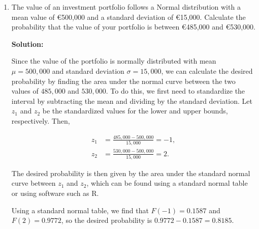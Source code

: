 \documentclass[12pt]{article}
\begin{document}
\begin{enumerate}
{\begin{enumerate}
\item Interpret the coefficients \( a \) and \( b \) from an economic perspective:

\begin{itemize}
    \item The intercept \( a = 2 \) represents the predicted inflation rate when the unemployment rate is zero. In economic terms, even with no unemployment, there is still some expected inflation (2%
    \item The slope \( b = -0.1 \) indicates that for each 1\% increase in the unemployment rate, inflation is expected to decrease by 0.1\%. This is consistent with the inverse relationship described by the Phillips curve, which suggests that higher unemployment typically leads to lower inflation.
\end{itemize}

\end{enumerate}


}

\item   The value of an investment portfolio follows a Normal distribution with a mean value of €500,000 and a standard deviation of €15,000. Calculate the probability that the value of your portfolio is between €485,000 and €530,000.

{\color{blue}
\noindent \textbf{Solution:}

Since the value of the portfolio is normally distributed with mean $\mu = 500,000$ and standard deviation $\sigma = 15,000$, we can calculate the desired probability by finding the area under the normal curve between the two values of $485,000$ and $530,000$. To do this, we first need to standardize the interval by subtracting the mean and dividing by the standard deviation. Let $z_1$ and $z_2$ be the standardized values for the lower and upper bounds, respectively. Then,

\begin{align*}
	z_1 &= \frac{485,000 - 500,000}{15,000} = -1, \\
	z_2 &= \frac{530,000 - 500,000}{15,000} = 2.
\end{align*}

The desired probability is then given by the area under the standard normal curve between $z_1$ and $z_2$, which can be found using a standard normal table or using software such as R. 

Using a standard normal table, we find that $F(-1) = 0.1587$ and $F(2) = 0.9772$, so the desired probability is $0.9772 - 0.1587 = 0.8185$.

}
\end{enumerate}
\end{document}
